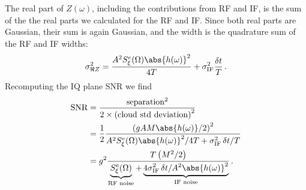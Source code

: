 
The real part of $Z(\omega)$, including the contributions from RF and IF, is the sum of the the real parts we calculated for the RF and IF.
Since both real parts are Gaussian, their sum is again Gaussian, and the width is the quadrature sum of the RF and IF widths:
\begin{equation}
  \sigma_{\Re Z}^2 =
    \frac{A^2 S^e_\xi(\Omega) \abs{h(\omega)}^2}{4T}
    + \sigma_\text{IF}^2 \frac{\delta t}{T} \, .
\end{equation}
Recomputing the IQ plane SNR we find
\begin{align}
  \text{SNR}
    &= \frac{\text{separation}^2}{2 \times \left( \text{cloud std deviation} \right)^2} \nonumber \\
    &= \frac{1}{2}
       \frac{\left( g A M \abs{h(\omega)} / 2 \right)^2}
            {A^2 S^e_\xi(\Omega) \abs{h(\omega)}^2 / 4T + \sigma_\text{IF}^2 \, \delta t / T} \nonumber \\
    &= g^2 \frac{T \left( M^2 / 2 \right)}
        {\underbrace{S^e_\xi(\Omega)}_\text{RF noise} + \underbrace{4 \sigma_\text{IF}^2 \, \delta t / A^2 \abs{h(\omega)}^2}_\text{IF noise}}
  \, .
\end{align}

